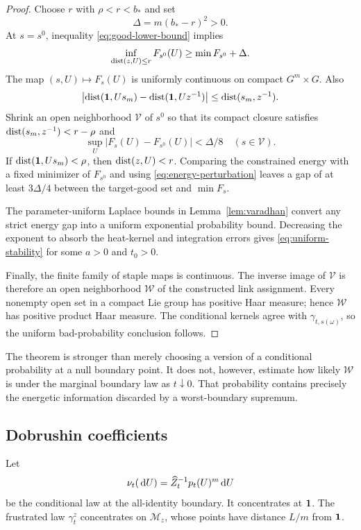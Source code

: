 \begin{proof}
Choose $r$ with $\rho<r<b_*$ and set
\begin{equation}\label{eq:stability-gap}
  \Delta=m(b_*-r)^2>0.
\end{equation}
At $s=s^0$, inequality \eqref{eq:good-lower-bound} implies
\[
 \inf_{\operatorname{dist}(z,U)\leq r}F_{s^0}(U)
 \geq \min F_{s^0}+\Delta.
\]
The map $(s,U)\mapsto F_s(U)$ is uniformly continuous on compact $G^m\times
G$.  Also
\[
 \bigl|\operatorname{dist}(\mathbf 1,Us_m)-\operatorname{dist}(\mathbf 1,Uz^{-1})\bigr|
 \leq\operatorname{dist}(s_m,z^{-1}).
\]
Shrink an open neighborhood $\mathcal V$ of $s^0$ so that its compact
closure satisfies
$\operatorname{dist}(s_m,z^{-1})<r-\rho$ and
\begin{equation}\label{eq:energy-perturbation}
 \sup_U|F_s(U)-F_{s^0}(U)|<\Delta/8
 \quad(s\in\mathcal V).
\end{equation}
If $\operatorname{dist}(\mathbf 1,Us_m)<\rho$, then $\operatorname{dist}(z,U)<r$.  Comparing the constrained
energy with a fixed minimizer of $F_{s^0}$ and using
\eqref{eq:energy-perturbation} leaves a gap of at least $3\Delta/4$ between
the target-good set and $\min F_s$.

The parameter-uniform Laplace bounds in Lemma~\ref{lem:varadhan} convert any
strict energy gap into a uniform exponential probability bound.  Decreasing
the exponent to absorb the heat-kernel and integration errors gives
\eqref{eq:uniform-stability} for some $a>0$ and $t_0>0$.

Finally, the finite family of staple maps is continuous.  The inverse image
of $\mathcal V$ is therefore an open neighborhood $\mathcal W$ of the
constructed link assignment.  Every nonempty open set in a compact Lie group
has positive Haar measure; hence $\mathcal W$ has positive product Haar
measure.  The conditional kernels agree with $\gamma_{t,s(\omega)}$, so the
uniform bad-probability conclusion follows.
\end{proof}

The theorem is stronger than merely choosing a version of a conditional
probability at a null boundary point.  It does not, however, estimate how
likely $\mathcal W$ is under the marginal boundary law as $t\downarrow0$.
That probability contains precisely the energetic information discarded by
a worst-boundary supremum.

\subsection{Dobrushin coefficients}

Let
\begin{equation}\label{eq:coherent-law}
 \nu_t(\,\mathrm d U)=\widehat Z_t^{-1}p_t(U)^m\,\mathrm dU
\end{equation}
be the conditional law at the all-identity boundary.  It concentrates at
$\mathbf 1$.  The frustrated law $\gamma_t^z$ concentrates on
$\mathcal M_z$, whose points have distance $L/m$ from $\mathbf 1$.

